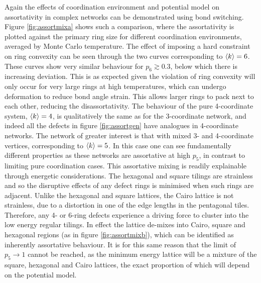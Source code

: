 Again the effects of coordination environment and potential model on assortativity in complex networks can be demonstrated using bond switching.
Figure \ref{fig:assortmixa} shows such a comparison, where the assortativity is plotted against the primary ring size for different coordination environments, averaged by Monte Carlo temperature.
The effect of imposing a hard constraint on ring convexity can be seen through the two curves corresponding to $\langle k \rangle=6$.
These curves show very similar behaviour for $p_6\gtrsim0.3$, below which there is increasing deviation.
This is as expected given the violation of ring convexity will only occur for very large rings at high temperatures, which can undergo deformation to reduce bond angle strain.
This allows larger rings to pack next to each other, reducing the disassortativity.
The behaviour of the pure 4\--coordinate system, $\langle k \rangle=4$, is qualitatively the same as for the 3\--coordinate network, and indeed all the defects in figure \ref{fig:assortgen} have analogues in 4\--coordinate networks.
The network of greater interest is that with mixed 3\-- and 4\--coordinate vertices, corresponding to $\langle k \rangle=5$.
In this case one can see fundamentally different properties as these networks are assortative at high $p_5$, in contrast to limiting pure coordination cases.
This assortative mixing is readily explainable through energetic considerations.
The hexagonal and square tilings are strainless and so the disruptive effects of any defect rings is minimised when such rings are adjacent.
Unlike the hexagonal and square lattices, the Cairo lattice is not strainless, due to a distortion in one of the edge lengths in the pentagonal tiles.
Therefore, any 4- or 6-ring defects experience a driving force to cluster into the low energy regular tilings.
In effect the lattice de\--mixes into Cairo, square and hexagonal regions (as in figure \ref{fig:assortmixb}), which can be identified as inherently assortative behaviour.
It is for this same reason that the limit of $p_5\rightarrow 1$ cannot be reached, as the minimum energy lattice will be a mixture of the square, hexagonal and Cairo lattices, the exact proportion of which will depend on the potential model.


